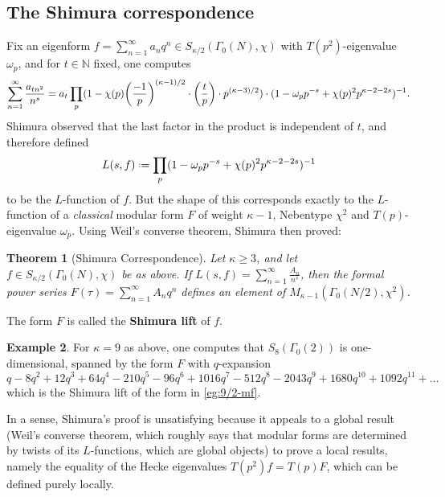 \documentclass[11pt,a4paper,leqno]{article}
\newcommand{\1}{\mathbbm{1}}
\newcommand{\N}{\mathbb{N}}
\newcommand*{\defeq}{\mathrel{\vcenter{\baselineskip0.5ex \lineskiplimit0pt
      \hbox{\scriptsize.}\hbox{\scriptsize.}}}%
  =}
\theoremstyle{plain}
\newtheorem{theorem}{Theorem}[section]
\theoremstyle{definition}
\newtheorem{example}[theorem]{Example}
\theoremstyle{remark}
\numberwithin{equation}{section}
\begin{document}
\subsection{The Shimura correspondence}
\label{sec:shim-corr}
Fix an eigenform $f = \sum_{n=1}^{\infty}a_{n}q^{n} \in S_{\kappa/2}(\Gamma_{0}(N),\chi)$
with $T(p^{2})$-eigenvalue $\omega_{p}$, and for $t \in \N$ fixed,
one computes
\begin{equation}
  \label{eq:5}
\sum_{n=1}^{\infty}\frac{a_{tn^{2}}}{n^{s}} = a_{t} \prod_{p}(1 -
\chi(p)\qty(\frac{-1}{p})^{(\kappa-1)/2}\cdot \qty(\frac{t}{p})\cdot p^{(\kappa-3)/2}) \cdot (1 -
\omega_{p}p^{-s} + \chi(p)^{2}p^{\kappa-2-2s})^{-1}.
\end{equation}
Shimura observed that the last factor in the product is
independent of $t$, and therefore defined
\begin{equation}
  \label{eq:5}
L(s,f) \defeq \prod_{p}(1 - \omega_{p}p^{-s} + \chi(p)^{2}p^{\kappa-2-2s})^{-1}
\end{equation}
to be the $L$-function of $f$. But the shape of this corresponds
exactly to the $L$-function of a \emph{classical} modular form $F$
of weight $\kappa-1$, Nebentype $\chi^{2}$ and $T(p)$-eigenvalue $\omega_{p}$.
Using Weil's converse theorem, Shimura then proved:

\begin{theorem}[Shimura Correspondence]
Let $\kappa \ge 3$, and let $f \in S_{\kappa/2}(\Gamma_{0}(N),\chi)$ be as above. If $L(s,f)
= \sum_{n=1}^{\infty}\frac{A_{n}}{n^{s}}$, then the formal power series $F(\tau)
= \sum_{n=1}^{\infty} A_{n}q^{n}$ defines an element of $M_{\kappa-1}(\Gamma_{0}(N/2),\chi^{2})$.
\end{theorem}
The form $F$ is called the \textbf{Shimura lift} of $f$.
\begin{example}
  For $\kappa = 9$ as above, one computes that $S_{8}(\Gamma_{0}(2))$ is
  one-dimensional, spanned by the form $F$ with $q$-expansion
  \begin{equation}
    \label{eq:7}
q - 8q^2 + 12q^3 + 64q^4 - 210q^5 - 96q^6 + 1016q^7 - 512q^8 - 2043q^9 + 1680q^{10} + 1092q^{11} + \ldots
  \end{equation}
which is the Shimura lift of the form in \cref{eg:9/2-mf}.
\end{example}
In a sense, Shimura's proof is unsatisfying because it appeals to a
global result (Weil's converse theorem, which roughly says that
modular forms are determined by twists of its $L$-functions, which are
global objects) to prove a local results, namely the equality of the
Hecke eigenvalues $T(p^{2})f = T(p)F$, which can be defined purely
locally.
\end{document}
